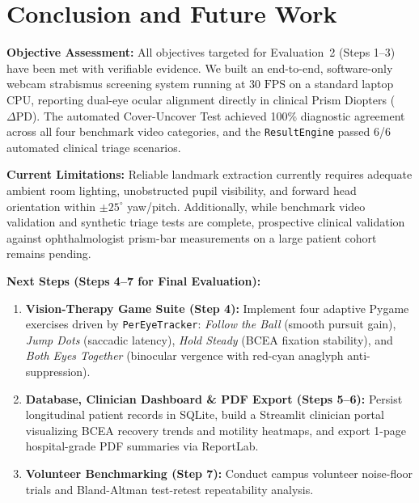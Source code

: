 \documentclass[11pt,a4paper]{article}
\begin{document}
\section{Conclusion and Future Work}
\textbf{Objective Assessment:} All objectives targeted for Evaluation~2 (Steps 1--3) have been met with verifiable evidence. We built an end-to-end, software-only webcam strabismus screening system running at $30\text{ FPS}$ on a standard laptop CPU, reporting dual-eye ocular alignment directly in clinical Prism Diopters ($\Delta\text{PD}$). The automated Cover-Uncover Test achieved 100\% diagnostic agreement across all four benchmark video categories, and the \texttt{ResultEngine} passed 6/6 automated clinical triage scenarios.

\textbf{Current Limitations:} Reliable landmark extraction currently requires adequate ambient room lighting, unobstructed pupil visibility, and forward head orientation within $\pm 25^\circ$ yaw/pitch. Additionally, while benchmark video validation and synthetic triage tests are complete, prospective clinical validation against ophthalmologist prism-bar measurements on a large patient cohort remains pending.

\textbf{Next Steps (Steps 4--7 for Final Evaluation):}
\begin{enumerate}
    \item \textbf{Vision-Therapy Game Suite (Step 4):} Implement four adaptive Pygame exercises driven by \texttt{PerEyeTracker}: \emph{Follow the Ball} (smooth pursuit gain), \emph{Jump Dots} (saccadic latency), \emph{Hold Steady} (BCEA fixation stability), and \emph{Both Eyes Together} (binocular vergence with red-cyan anaglyph anti-suppression).
    \item \textbf{Database, Clinician Dashboard \& PDF Export (Steps 5--6):} Persist longitudinal patient records in SQLite, build a Streamlit clinician portal visualizing BCEA recovery trends and motility heatmaps, and export 1-page hospital-grade PDF summaries via ReportLab.
    \item \textbf{Volunteer Benchmarking (Step 7):} Conduct campus volunteer noise-floor trials and Bland-Altman test-retest repeatability analysis.
\end{enumerate}
\end{document}
